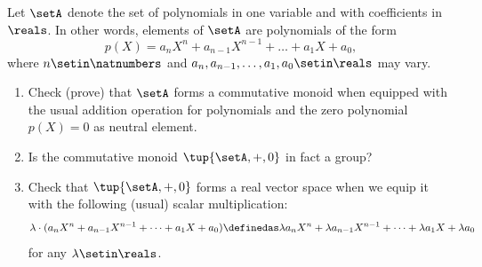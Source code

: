 {

\begin{gradedexercise}
    \label{ex:real-polynomials}
    Let $\setA$ denote the set of polynomials in one variable and with coefficients in $\reals$.
    In other words, elements of $\setA$ are polynomials of the form
    \begin{equation}
        p(X) = a_nX^n + a_{n-1}
        X^{n-1} + \dots + a_1X + a_0,
    \end{equation}
    where $n \setin \natnumbers$ and $a_n, a_{n-1}, \dots, a_1, a_0 \setin \reals$ may vary.

    \begin{enumerate}
        \item Check (prove) that $\setA$ forms a commutative monoid when equipped with the usual addition operation for polynomials and the zero polynomial $p(X) = 0$ as neutral element.
        \item Is the commutative monoid $\tup{\setA, +, 0}$ in fact a group?
        \item Check that $\tup{\setA, +, 0}$ forms a real vector space when we equip it with the following (usual) scalar multiplication:
              \begin{equation}
                  \lambda \cdot (a_nX^n + a_{n-1}
                  X^{n-1} + \dots + a_1X + a_0) \definedas \lambda a_nX^n + \lambda a_{n-1}X^{n-1} + \dots + \lambda a_1X + \lambda a_0
              \end{equation}
              for any $\lambda \setin \reals$.
    \end{enumerate}
\end{gradedexercise}


}
